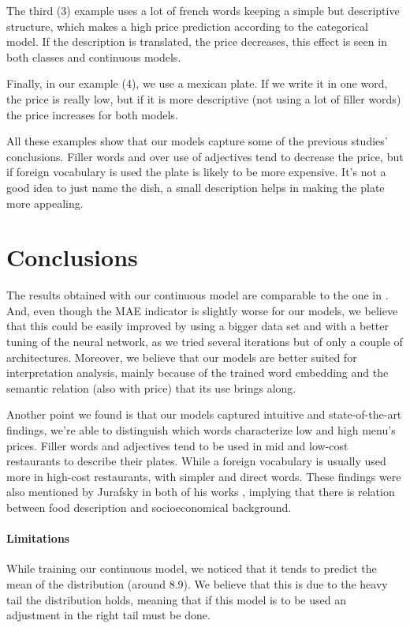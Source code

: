 \documentclass[11pt,letterpaper]{article}
\begin{document}
The third (3) example uses a lot of french words keeping a simple but descriptive structure, which makes a high price prediction according to the categorical model. If the description is translated, the price decreases, this effect is seen in both classes and continuous models. 

Finally, in our example (4), we use a mexican plate. If we write it in one word, the price is really low, but if it is more descriptive (not using a lot of filler words) the price increases for both models.

All these examples show that our models capture some of the previous studies' conclusions. Filler words and over use of adjectives tend to decrease the price, but if foreign vocabulary is used the plate is likely to be more expensive. It's not a good idea to just name the dish, a small description helps in making the plate more appealing. 



\section{Conclusions}
The results obtained with our continuous model are comparable to the one in \cite{chahuneau2012word}.  And, even though the MAE indicator is slightly worse for our models, we believe that this could be easily improved by using a bigger data set and with a better tuning of the neural network, as we tried several iterations but of only a couple of architectures. Moreover, we believe that our models are better suited for interpretation analysis, mainly because of the trained word embedding and the semantic relation (also with price) that its use brings along.


Another point we found is that our models captured intuitive and state-of-the-art findings, we're able to distinguish which words characterize low and high menu's prices. Filler words and adjectives tend to be used in mid and low-cost restaurants to describe their plates. While a foreign vocabulary is usually used more in high-cost restaurants, with simpler and direct words. These findings were also mentioned by Jurafsky in both of his works \cite{jurafsky2014language,jurafsky2016bordieu}, implying that there is relation between food description and socioeconomical background.




\paragraph{Limitations}
While training our continuous model, we noticed that it tends to predict the mean of the distribution (around 8.9). We believe that this is due to the heavy tail the distribution holds, meaning that if this model is to be used an adjustment in the right tail must be done. 
\end{document}
